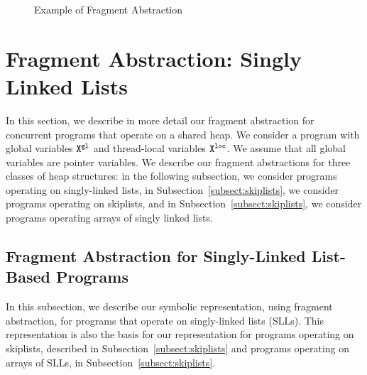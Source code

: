 \begin{center}
\begin{figure}

\caption{Example of Fragment Abstraction}
\label{lazylist}
\end{figure}
\end{center}
\section{Fragment Abstraction: Singly Linked Lists}
\label{sec:fragment-abstraction}
In this section, we describe in more detail our fragment abstraction for
concurrent programs that operate on a shared heap.
We consider a program with global variables ${\tt X}^{\tt gl}$ and
thread-local variables ${\tt X}^{\tt loc}$.
We assume that all global variables are pointer variables.
We describe our fragment abstractions for three classes of heap structures:
in the following subsection, we consider programs operating on singly-linked
lists, in Subsection~\ref{subsect:skiplists}, we consider programs operating
on skiplists, and in
Subsection~\ref{subsect:skiplists}, we consider programs operating
arrays of singly linked lists.



\subsection{Fragment Abstraction for Singly-Linked List-Based Programs}
In this subsection, we describe our symbolic representation, using fragment
abstraction, for programs that operate on singly-linked lists (SLLs). This
representation is also the basis for our representation for programs
operating on skiplists, described in Subsection~\ref{subsect:skiplists}
and programs operating on arrays of SLLs, in Subsection~\ref{subsect:skiplists}.

